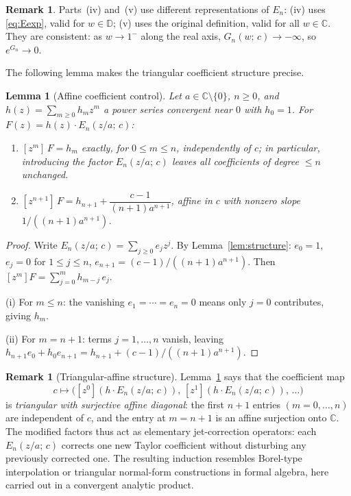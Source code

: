 \documentclass[12pt]{amsart}
\newtheorem{lemma}[theorem]{Lemma}
\theoremstyle{definition}
\newtheorem{remark}[theorem]{Remark}
\newcommand{\D}{\mathbb{D}}
\newcommand{\C}{\mathbb{C}}
\begin{document}
\begin{remark}
Parts~(iv) and~(v) use different representations of $E_n$: (iv) uses
\eqref{eq:Eexp}, valid for $w \in \D$; (v) uses the original definition,
valid for all $w \in \C$.  They are consistent: as $w \to 1^-$ along
the real axis, $G_n(w;\,c) \to -\infty$, so $e^{G_n} \to 0$.
\end{remark}

The following lemma makes the triangular coefficient structure precise.

\begin{lemma}[Affine coefficient control]
\label{lem:affine}
Let $a \in \C \setminus \{0\}$, $n \geq 0$, and $h(z) =
\sum_{m \geq 0} h_m z^m$ a power series convergent near $0$ with
$h_0 = 1$.  For $F(z) = h(z)\cdot E_n(z/a;\,c)$:
\begin{enumerate}
\item[(i)] $[z^m]\,F = h_m$ exactly, for $0 \leq m \leq n$,
  independently of $c$; in particular, introducing the factor
  $E_n(z/a;\,c)$ leaves all coefficients of degree $\leq n$ unchanged.
\item[(ii)] $[z^{n+1}]\,F = h_{n+1} + \dfrac{c-1}{(n+1)a^{n+1}}$,
  affine in $c$ with nonzero slope $1/((n+1)a^{n+1})$.
\end{enumerate}
\end{lemma}

\begin{proof}
Write $E_n(z/a;\,c) = \sum_{j \geq 0} e_j z^j$.  By
Lemma~\ref{lem:structure}: $e_0 = 1$, $e_j = 0$ for $1 \leq j \leq n$,
$e_{n+1} = (c-1)/((n+1)a^{n+1})$.  Then $[z^m]F = \sum_{j=0}^m
h_{m-j}\,e_j$.

(i) For $m \leq n$: the vanishing $e_1 = \cdots = e_n = 0$ means only
$j=0$ contributes, giving $h_m$.

(ii) For $m=n+1$: terms $j=1,\ldots,n$ vanish, leaving
$h_{n+1}e_0 + h_0 e_{n+1} = h_{n+1} + (c-1)/((n+1)a^{n+1})$.
\end{proof}

\begin{remark}[Triangular-affine structure]
\label{rem:triangular}
Lemma~\ref{lem:affine} says that the coefficient map
\[
  c \mapsto \bigl([z^0](h\cdot E_n(z/a;\,c)),\,
                  [z^1](h\cdot E_n(z/a;\,c)),\,\ldots\bigr)
\]
is \emph{triangular with surjective affine diagonal}: the first $n+1$
entries $(m = 0,\ldots,n)$ are independent of $c$, and the entry at
$m = n+1$ is an affine surjection onto $\C$.  The modified factors thus
act as elementary jet-correction operators: each $E_n(z/a;\,c)$ corrects
one new Taylor coefficient without disturbing any previously corrected
one.  The resulting induction resembles Borel-type interpolation or
triangular normal-form constructions in formal algebra, here carried
out in a convergent analytic product.
\end{remark}
\end{document}
